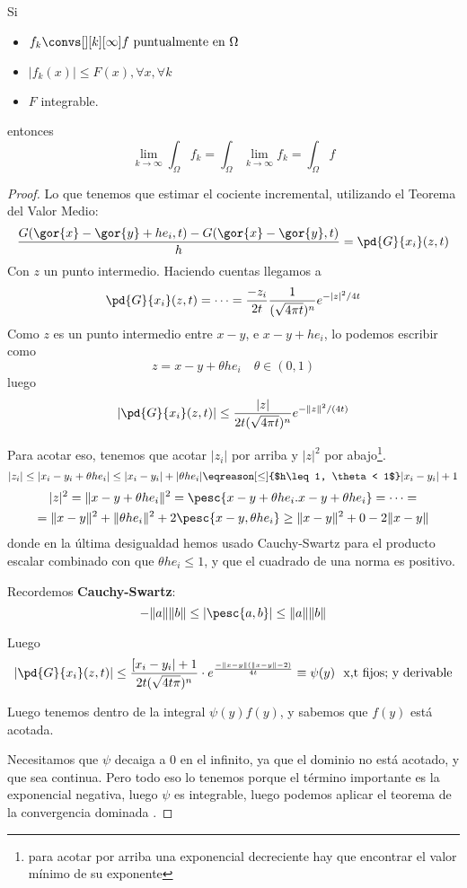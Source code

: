 		\begin{theorem}
			Si
			\begin{itemize}
				\item $ f_k \convs[ ][k][\infty] f \text{ puntualmente en } \Omega $
				\item $ | f_k (x) | \leq F(x), \forall x, \forall k $
				\item $ F $ integrable.
			\end{itemize}
			entonces
			\[ \lim_{k \to \infty} \int_\Omega f_k = \int_\Omega \lim_{k\to \infty} f_k = \int_\Omega f \]
		\end{theorem}
		\begin{proof}
		Lo que tenemos que estimar el cociente incremental, utilizando el Teorema del Valor Medio:
		\[ \frac{G(\gor{x}-\gor{y}+he_i,t)-G(\gor{x}-\gor{y},t)}{h} = \pd{G}{x_i}(z,t) \]
		Con $z$ un punto intermedio. Haciendo cuentas llegamos a
		\[ \pd{G}{x_i}(z,t) = \dots = \frac{-z_i}{2t} \frac{1}{(\sqrt{4 \pi t}) ^n} e^{-|z|^2 / 4t} \]
		Como $z$ es un punto intermedio entre $x-y$, e $x-y+h e_i$, lo podemos escribir como \[ z = x - y + \theta h e_i \quad \theta \in (0,1) \]
		luego
		\[ \left| \pd{G}{x_i} (z,t) \right| \leq \frac{|z|}{2t (\sqrt{4 \pi t})^n} e^{- \| z \|^2 / (4t)} \]

		Para acotar eso, tenemos que acotar $|z_i|$ por arriba y $|z|^2$ por abajo\footnote{para acotar por arriba una exponencial decreciente hay que encontrar el valor mínimo de su exponente}.
		\[ |z_i| \leq |x_i - y_i + \theta h e_i| \leq |x_i - y_i| + |\theta h e_i| \eqreason[\leq]{$h\leq1, \theta < 1$} |x_i - y_i| + 1 \]
		\begin{gather*}
		|z|^2 = \| x - y + \theta h e_i \|^2 = \pesc{x - y + \theta h e_i. x - y + \theta h e_i} = \dots =\\
		= \| x - y \|^2 + \| \theta h e_i \|^2 + 2 \pesc{x-y, \theta h e_i} \geq \| x - y\|^2 + 0 - 2 \| x - y\|
		\end{gather*}
		donde en la última desigualdad hemos usado Cauchy-Swartz para el producto escalar combinado con que $\theta h e_i \leq 1$, y que el cuadrado de una norma es positivo.

		Recordemos {\bf Cauchy-Swartz}:
		\[ -\|a\| \|b\| \leq |\pesc{a, b}| \leq \|a\| \|b\| \]

		Luego
		\[ \left| \pd{G}{x_i} (z,t) \right| \leq \frac{[x_i - y_i| + 1}{2t (\sqrt{4t \pi})^n} \cdot e^{\frac{-\| x-y \|(\| x-y \| - 2)}{4t} } \equiv \psi(y) \ \text{ x,t fijos; y derivable}\]

		Luego tenemos dentro de la integral $\psi(y) f(y)$, y sabemos que $f(y)$ está acotada.

		Necesitamos que $\psi$ decaiga a 0 en el infinito, ya que el dominio no está acotado, y que sea continua. Pero todo eso lo tenemos porque el término importante es la exponencial negativa, luego $\psi$ es integrable, luego podemos aplicar el teorema de la convergencia dominada .
		\end{proof}

